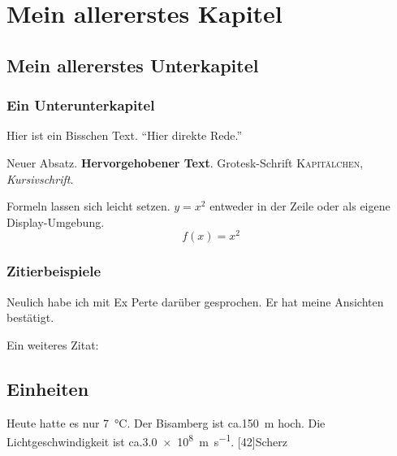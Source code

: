 \chapter{Mein allererstes Kapitel}
\section{Mein allererstes Unterkapitel}
\subsection{Ein Unterunterkapitel}

Hier ist ein Bisschen    
 {\Huge Text}. "`Hier direkte Rede."'
 
Neuer Absatz. \textbf{Hervorgehobener Text}. \textsf{Grotesk-Schrift}
\textsc{Kapitälchen}, \textit{Kursivschrift}.

Formeln lassen sich leicht setzen. $y=x^2$ entweder in der Zeile oder als
eigene Display-Umgebung.
\begin{equation}
f(x)=x^2
\end{equation}

\subsection{Zitierbeispiele}
Neulich habe ich mit Ex Perte darüber gesprochen. Er hat meine Ansichten
bestätigt.



Ein weiteres Zitat: 

\section{Einheiten}
Heute hatte es nur \SI{7}{\celsius}. Der Bisamberg ist ca.\@ \SI{150}{\meter}
hoch. Die Lichtgeschwindigkeit ist ca.\@ \SI{3.0e8}{\meter\per\second}.
[42]{Scherz}

